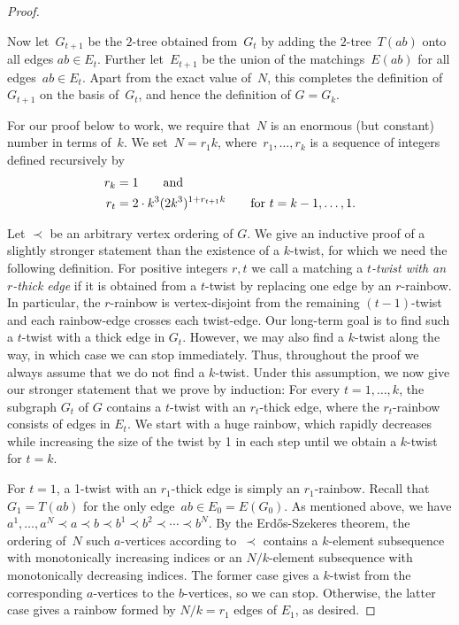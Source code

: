 \documentclass{theoretics}
\begin{document}
\begin{proof}
\begin{subproof}
    Now let~$G_{t+1}$ be the $2$-tree obtained from~$G_t$ by adding the $2$-tree~$T(ab)$ onto all edges $ab \in E_t$.
    Further let~$E_{t+1}$ be the union of the matchings~$E(ab)$ for all edges~$ab \in E_t$.
    Apart from the exact value of~$N$, this completes the definition of~$G_{t+1}$ on the basis of~$G_t$, and hence the definition of $G = G_k$.

    For our proof below to work, we require that~$N$ is an enormous (but constant) number in terms of~$k$.
    We set~$N = r_1k$, where~$r_1, \ldots, r_k$ is a sequence of integers defined recursively by
    \begin{align*}
        r_k &= 1 \qquad \text{and} \\
        r_t &= 2 \cdot k^3 (2 k^3)^{1 + r_{t+1} k} \qquad \text{for $t = k-1, \ldots, 1$}
        \text{.}\qedhere 
    \end{align*}
	\end{subproof}

	\begin{subproof}
    Let $ \prec $ be an arbitrary vertex ordering of $ G $.
    We give an inductive proof of a slightly stronger statement than the existence of a $ k $-twist, for which we need the following definition.
    For positive integers $ r, t $ we call a matching a \emph{$ t $-twist with an $ r $-thick edge} if it is obtained from a $ t $-twist by replacing one edge by an $ r $-rainbow.
    In particular, the $ r $-rainbow is vertex-disjoint from the remaining $ (t-1) $-twist and each rainbow-edge crosses each twist-edge.
    Our long-term goal is to find such a $ t $-twist with a thick edge in $ G_t $. 
    However, we may also find a $ k $-twist along the way, in which case we can stop immediately.
    Thus, throughout the proof we always assume that we do not find a $ k $-twist.
    Under this assumption, we now give our stronger statement that we prove by induction:
    For every $ t = 1, \dots, k $, the subgraph $ G_t $ of $ G $ contains a $ t $-twist with an $ r_t $-thick edge, where the $ r_t $-rainbow consists of edges in $E_t$.
    We start with a huge rainbow, which rapidly decreases while increasing the size of the twist by 1 in each step until we obtain a $ k $-twist for $ t = k $.
    \end{subproof}
    
    For $ t = 1 $, a 1-twist with an $ r_1 $-thick edge is simply an $ r_1 $-rainbow.
    Recall that~$G_1 = T(ab)$ for the only edge~$ab \in E_0 = E(G_0)$.
    As mentioned above, we have $a^1, \ldots, a^N \prec a \prec b \prec b^1 \prec b^2 \prec \cdots \prec b^N$.
    By the Erd\H{o}s-Szekeres theorem, the ordering of~$N$ such $a$-vertices according to~$\prec$ contains a $k$-element subsequence with monotonically increasing indices or an $N/k$-element subsequence with monotonically decreasing indices.
    The former case gives a $k$-twist from the corresponding $a$-vertices to the $b$-vertices, so we can stop.
    Otherwise, the latter case gives a rainbow formed by $N/k = r_1$ edges of $ E_1 $, as desired.
    

\end{proof}
\end{document}
